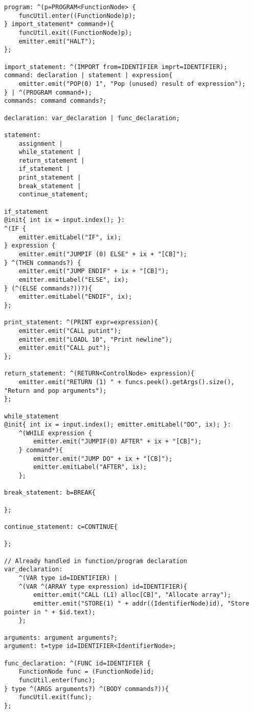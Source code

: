 \begin{landscape}
\begin{lstlisting}
program: ^(p=PROGRAM<FunctionNode> {
    funcUtil.enter((FunctionNode)p);
} import_statement* command+){
    funcUtil.exit((FunctionNode)p);
    emitter.emit("HALT");
};
    
import_statement: ^(IMPORT from=IDENTIFIER imprt=IDENTIFIER);
command: declaration | statement | expression{
    emitter.emit("POP(0) 1", "Pop (unused) result of expression");
} | ^(PROGRAM command+);
commands: command commands?;

declaration: var_declaration | func_declaration;

statement:
    assignment |
    while_statement |
    return_statement |
    if_statement |
    print_statement |
    break_statement |
    continue_statement;

if_statement
@init{ int ix = input.index(); }:
^(IF {
    emitter.emitLabel("IF", ix);
} expression {
    emitter.emit("JUMPIF (0) ELSE" + ix + "[CB]");
} ^(THEN commands?) {
    emitter.emit("JUMP ENDIF" + ix + "[CB]");
    emitter.emitLabel("ELSE", ix);
} (^(ELSE commands?))?){
    emitter.emitLabel("ENDIF", ix);
};

print_statement: ^(PRINT expr=expression){
    emitter.emit("CALL putint");
    emitter.emit("LOADL 10", "Print newline");
    emitter.emit("CALL put");
};

return_statement: ^(RETURN<ControlNode> expression){
    emitter.emit("RETURN (1) " + funcs.peek().getArgs().size(), "Return and pop arguments");
};

while_statement
@init{ int ix = input.index(); emitter.emitLabel("DO", ix); }:
    ^(WHILE expression {
        emitter.emit("JUMPIF(0) AFTER" + ix + "[CB]");
    } command*){
        emitter.emit("JUMP DO" + ix + "[CB]");
        emitter.emitLabel("AFTER", ix);
    };

break_statement: b=BREAK{

};

continue_statement: c=CONTINUE{

};

// Already handled in function/program declaration
var_declaration: 
    ^(VAR type id=IDENTIFIER) |
    ^(VAR ^(ARRAY type expression) id=IDENTIFIER){
        emitter.emit("CALL (L1) alloc[CB]", "Allocate array");
        emitter.emit("STORE(1) " + addr((IdentifierNode)id), "Store pointer in " + $id.text);
    };

arguments: argument arguments?;
argument: t=type id=IDENTIFIER<IdentifierNode>;

func_declaration: ^(FUNC id=IDENTIFIER {
    FunctionNode func = (FunctionNode)id;
    funcUtil.enter(func);
} type ^(ARGS arguments?) ^(BODY commands?)){
    funcUtil.exit(func);
};


\end{lstlisting}
\end{landscape}
